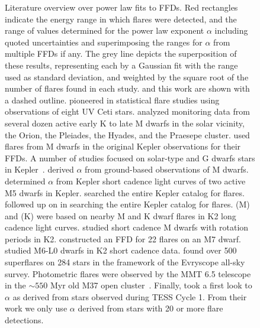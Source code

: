 \documentclass{aa}
\begin{document}
\begin{appendix}
\begin{figure}
         \caption{Literature overview over power law fits to FFDs. Red rectangles indicate the energy range in which flares were detected, and the range of values determined for the power law exponent $\alpha$ including quoted uncertainties and superimposing the ranges for $\alpha$ from multiple FFDs if any. The grey line depicts the superposition of these results, representing each by a Gaussian fit with the range used as standard deviation, and weighted by the square root of the number of flares found in each study.  and this work are shown with a dashed outline. \citet{lacy_uv_1976} pioneered in statistical flare studies using observations of eight UV Ceti stars. \citet{shakhovskaya_stellar_1989} analyzed monitoring data from several dozen active early K to late M dwarfs in the solar vicinity, the Orion, the Pleiades, the Hyades, and the Praesepe cluster. \citet{hawley_kepler_2014} used flares from M dwarfs in the original Kepler observations for their FFDs. A number of studies focused on solar-type and G dwarfs stars in Kepler~\citep{maehara2012,wu2015,shibayama2013}. \citet{hilton2011} derived $\alpha$ from ground-based observations of M dwarfs. \citet{lurie2015} determined $\alpha$ from Kepler short cadence light curves of two active M5 dwarfs in Kepler. \citet{davenport_kepler_2016} searched the entire Kepler catalog for flares. \citet{yang_flaring_2017} followed up on \citet{davenport_kepler_2016} in searching the entire Kepler catalog for flares. \citet{lin2019} (M) and (K) were based on nearby M and K dwarf flares in K2 long cadence light curves. \citep{raetz2020} studied short cadence M dwarfs with rotation periods in K2. \citet{gizis_k2_2017-1} constructed an FFD for 22 flares on an M7 dwarf. \citet{paudel2018} studied M6-L0 dwarfs in K2 short cadence data. \citet{howard2019} found over 500 superflares on 284 stars in the framework of the Evryscope all-sky survey. Photometric flares were observed by the MMT 6.5 telescope~\citep{hartman2008} in the $\sim550$ Myr old M37 open cluster~\citep{chang2015}. Finally, \citep{guenther2020} took a first look to $\alpha$ as derived from stars observed during TESS Cycle 1. From their work we only use $\alpha$ derived from stars with 20 or more flare detections.
}
          \label{fig:app:powerlaw_literature}
     
   \end{figure}
\end{appendix}
\end{document}
